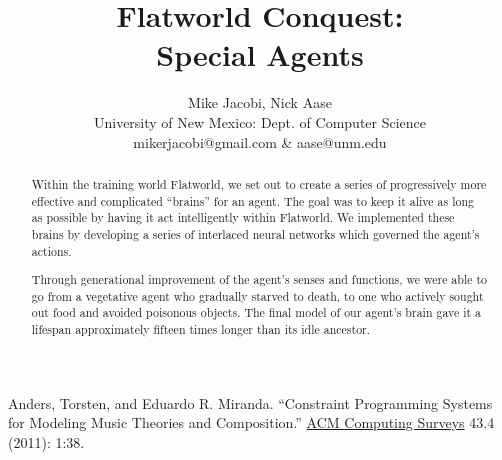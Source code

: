 \documentclass[12pt]{article}
\title{{\bf Flatworld Conquest:\\
    Special Agents}}
\author{Mike Jacobi, Nick Aase\\
University of New Mexico: Dept. of Computer Science\\
\normalsize  mikerjacobi@gmail.com \& aase@unm.edu}
\date{}
\begin{document}
\begin{sloppypar}

\maketitle



\renewcommand{\abstractname}{\Large Abstract}
\begin{abstract}
  \begin{singlespace}
    Within the training world Flatworld, we set out to create a series of 
    progressively more effective and complicated ``brains'' for an agent.
    The goal was to keep it alive as long as possible by having it act 
    intelligently within Flatworld. We implemented these brains by developing 
    a series of interlaced neural networks which governed the agent's actions.

    Through generational improvement of the agent's senses and functions,
    we were able to go from a vegetative agent who gradually starved to death,
    to one who actively sought out food and avoided poisonous objects. The
    final model of our agent's brain gave it a lifespan approximately 
    fifteen times longer than its idle ancestor.
  \end{singlespace}
\end{abstract}










\end{sloppypar}

\begin{thebibliography}{9}

  Anders, Torsten, and Eduardo R. Miranda. ``Constraint Programming Systems for Modeling Music Theories and Composition.'' \underline{ACM Computing Surveys} 43.4 (2011): 1:38.

\end{thebibliography}
\end{document}
